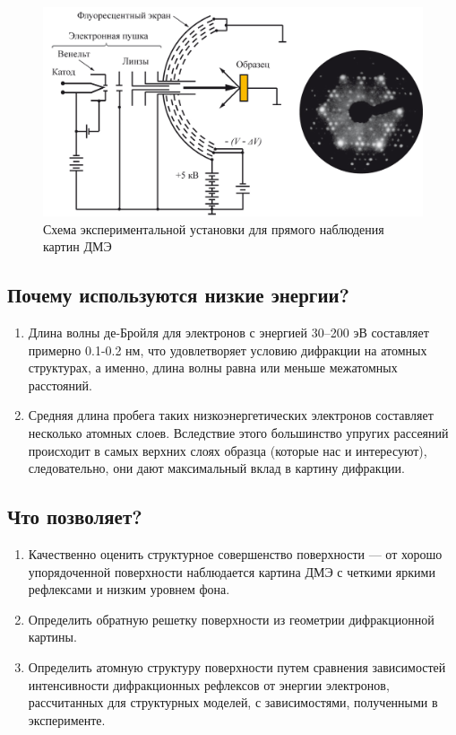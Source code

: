 \documentclass[a4paper, 12pt]{article}
\begin{document}
\begin{figure}[H]
	\centering
	\includegraphics[width=0.8\linewidth]{Slow_electrons}
	\caption{Схема экспериментальной установки для прямого наблюдения картин ДМЭ}
	\label{fig:exp_setup}
\end{figure}

\subsection{Почему используются низкие энергии?}

\begin{enumerate}
	\item Длина волны де-Бройля для электронов с энергией 30–200 эВ составляет примерно 0.1-0.2 нм, что удовлетворяет условию дифракции на атомных структурах, а именно, длина волны равна или меньше межатомных расстояний.
	
	\item Средняя длина пробега таких низкоэнергетических электронов составляет несколько атомных слоев. Вследствие этого большинство упругих рассеяний происходит в самых верхних слоях образца (которые нас и интересуют), следовательно, они дают максимальный вклад в картину дифракции.
\end{enumerate}

\subsection{Что позволяет?}

\begin{enumerate}
	\item Качественно оценить структурное совершенство поверхности — от хорошо упорядоченной поверхности наблюдается картина ДМЭ с четкими яркими рефлексами и низким уровнем фона.
	
	\item Определить обратную решетку поверхности из геометрии дифракционной картины.
	
	\item Определить атомную структуру поверхности путем сравнения зависимостей интенсивности дифракционных рефлексов от энергии электронов, рассчитанных для структурных моделей, с зависимостями, полученными в эксперименте.
	
\end{enumerate}
\end{document}

